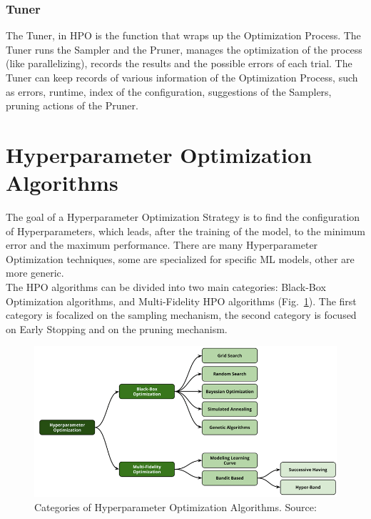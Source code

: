 \subsubsection{Tuner}

The Tuner, in HPO is the function that wraps up the Optimization Process. The Tuner runs the Sampler and the Pruner, manages the optimization of the process (like parallelizing), records the results and the possible errors of each trial.
The Tuner can keep records of various information of the Optimization Process, such as errors, runtime, index of the configuration, suggestions of the Samplers, pruning actions of the Pruner.

\section{Hyperparameter Optimization Algorithms}

The goal of a Hyperparameter Optimization Strategy is to find the configuration of Hyperparameters, which leads, after the training of the model, to the minimum error and the maximum performance.
There are many Hyperparameter Optimization techniques, some are specialized for specific ML models, other are more generic.
\\[0.3cm]The HPO algorithms can be divided into two main categories: Black-Box Optimization algorithms, and Multi-Fidelity HPO algorithms (Fig.~\ref{fig:figure-2.2.1}).
The first category is focalized on the sampling mechanism, the second category is focused on Early Stopping and on the pruning mechanism.
\begin{figure}[t]
	\centering
	\includegraphics[width=15cm]{figures/figure-2.2.1.png}
	\caption[Hyperparameter Optimization Algorithms]{Categories of Hyperparameter Optimization Algorithms. Source:~\cite{AutomatedML}}
	\label{fig:figure-2.2.1}
\end{figure}

